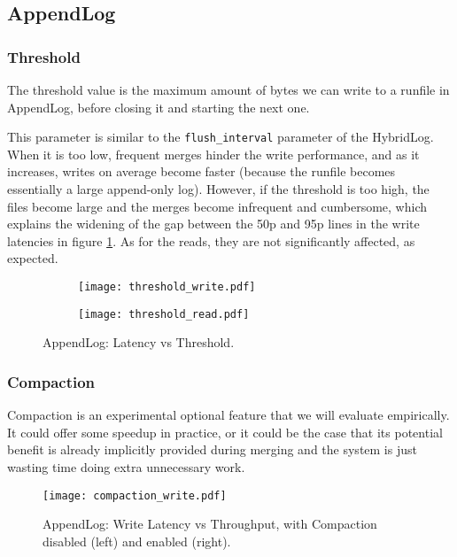 \subsection{AppendLog}

\subsubsection{Threshold}

The threshold value is the maximum amount of bytes we can write to a runfile in AppendLog, before closing it and starting the next one.

This parameter is similar to the \verb"flush_interval" parameter of the HybridLog. When it is too low, frequent merges hinder the write performance, and as it increases, writes on average become faster (because the runfile becomes essentially a large append-only log). However, if the threshold is too high, the files become large and the merges become infrequent and cumbersome, which explains the widening of the gap between the 50p and 95p lines in the write latencies in figure \ref{fig:threshold_write_read}. As for the reads, they are not significantly affected, as expected.

\begin{figure}[h]
    \begin{subfigure}{.5\textwidth}
        \centering
        \texttt{[image: threshold\_write.pdf]}
    \end{subfigure}
    \begin{subfigure}{.5\textwidth}
        \centering
        \texttt{[image: threshold\_read.pdf]}
    \end{subfigure}
    \caption{AppendLog: Latency vs Threshold.}
    \label{fig:threshold_write_read}
\end{figure}

\subsubsection{Compaction}

Compaction is an experimental optional feature that we will evaluate empirically. It could offer some speedup in practice, or it could be the case that its potential benefit is already implicitly provided during merging and the system is just wasting time doing extra unnecessary work.

\begin{figure}[h]
    \centering
    \texttt{[image: compaction\_write.pdf]}
    \caption{AppendLog: Write Latency vs Throughput, with Compaction disabled (left) and enabled (right).}
    \label{fig:compaction-write}
\end{figure}

